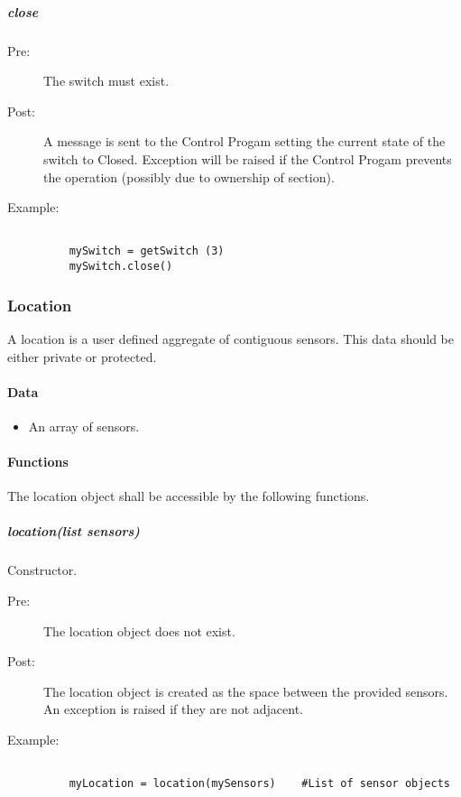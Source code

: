 \documentclass[a4paper,11pt,notitlepage]{article}
\def\CS{Control Progam\xspace}
\begin{document}
\subparagraph{close}
\begin{description}
\item[\hspace{1cm}Pre:] The switch must exist.
\item[\hspace{1cm}Post:] A message is sent to the \CS setting the current state of the switch to Closed. Exception will be raised if the \CS prevents the operation (possibly due to ownership of section).
\item[\hspace{1cm}Example:]
\begin{verbatim}

    mySwitch = getSwitch (3)
    mySwitch.close()
\end{verbatim}
\end{description}


\subsubsection{Location}
A location is a user defined aggregate of contiguous sensors. This data should be either private or protected. 
\paragraph{Data}
\begin{itemize}
\item An array of sensors.
\end{itemize}
\paragraph{Functions}
The location object shall be accessible by the following functions.

\subparagraph{location(list sensors)} Constructor.
\begin{description}
\item[\hspace{1cm}Pre:] The location object does not exist.
\item[\hspace{1cm}Post:] The location object is created as the space between the provided sensors. An exception is raised if they are not adjacent.
\item[\hspace{1cm}Example:]
\begin{verbatim}

    myLocation = location(mySensors)    #List of sensor objects
\end{verbatim}
\end{description}
\end{document}
